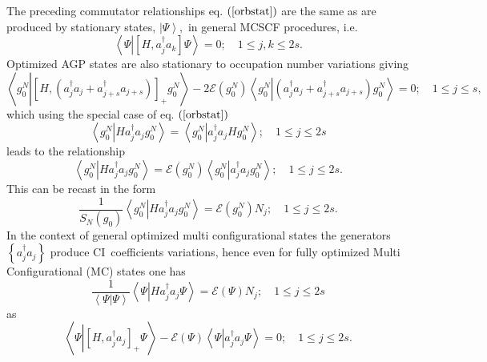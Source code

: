 \documentclass[aps,preprint]{revtex4}%
\begin{document}
The preceding commutator relationships eq. $\left(  \ref{orbstat}\right)  $
are the same as are produced by stationary states, $\left\vert \Psi
\right\rangle ,$ in general MCSCF procedures, i.e.
\begin{equation}
\left\langle \Psi\left\vert \left[  H,a_{j}^{\dagger}a_{k}\right]
\Psi\right.  \right\rangle =0;\quad1\leq j,k\leq2s.
\end{equation}
Optimized AGP states are also stationary to occupation number variations
giving
\begin{equation}
\left\langle g_{0}^{N}\left\vert \left[  H,\left(  a_{j}^{\dagger}%
a_{j}+a_{j+s}^{\dagger}a_{j+s}\right)  \right]  _{+}g_{0}^{N}\right.
\right\rangle -2\mathcal{E}\left(  g_{0}^{N}\right)  \left\langle g_{0}%
^{N}\left\vert \left(  a_{j}^{\dagger}a_{j}+a_{j+s}^{\dagger}a_{j+s}\right)
g_{0}^{N}\right.  \right\rangle =0;\quad1\leq j\leq s,
\end{equation}
which using the special case of eq. $\left(  \ref{orbstat}\right)  $
\begin{equation}
\left\langle g_{0}^{N}\left\vert Ha_{j}^{\dagger}a_{j}g_{0}^{N}\right.
\right\rangle =\left\langle g_{0}^{N}\left\vert a_{j}^{\dagger}a_{j}Hg_{0}%
^{N}\right.  \right\rangle ;\quad1\leq j\leq2s
\end{equation}
leads to the relationship
\begin{equation}
\left\langle g_{0}^{N}\left\vert Ha_{j}^{\dagger}a_{j}g_{0}^{N}\right.
\right\rangle =\mathcal{E}\left(  g_{0}^{N}\right)  \left\langle g_{0}%
^{N}\left\vert a_{j}^{\dagger}a_{j}g_{0}^{N}\right.  \right\rangle ;\quad1\leq
j\leq2s.
\end{equation}
This can be recast in the form
\begin{equation}
\frac{1}{S_{N}\left(  g_{0}\right)  }\left\langle g_{0}^{N}\left\vert
Ha_{j}^{\dagger}a_{j}g_{0}^{N}\right.  \right\rangle =\mathcal{E}\left(
g_{0}^{N}\right)  N_{j};\quad1\leq j\leq2s. \label{occnumstat}%
\end{equation}
In the context of general optimized multi configurational states the
generators $\left\{  a_{j}^{\dagger}a_{j}\right\}  $ produce CI\ coefficients
variations, hence even for fully optimized Multi Configurational (MC) states
one has
\begin{equation}
\frac{1}{\left\langle \left.  \Psi\right\vert \Psi\right\rangle }\left\langle
\Psi\left\vert Ha_{j}^{\dagger}a_{j}\Psi\right.  \right\rangle =\mathcal{E}%
\left(  \Psi\right)  N_{j};\quad1\leq j\leq2s \label{MCocc}%
\end{equation}
as
\begin{equation}
\left\langle \Psi\left\vert \left[  H,a_{j}^{\dagger}a_{j}\right]  _{+}%
\Psi\right.  \right\rangle -\mathcal{E}\left(  \Psi\right)  \left\langle
\Psi\left\vert a_{j}^{\dagger}a_{j}\Psi\right.  \right\rangle =0;\quad1\leq
j\leq2s.
\end{equation}
\end{document}
